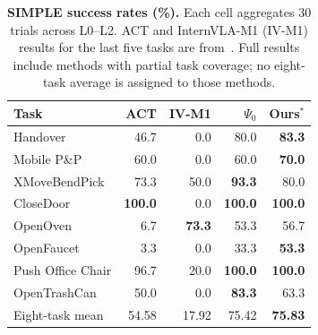 \begin{table}[t]
\centering\small
\caption{\textbf{SIMPLE success rates (\%).} Each cell aggregates 30 trials across L0--L2. ACT and InternVLA-M1 (IV-M1) results for the last five tasks are from~\cite{chen2026memorybeforegoal}. Full results include methods with partial task coverage; no eight-task average is assigned to those methods.}
\label{tab:simple_summary}
\setlength{\tabcolsep}{3.0pt}
\begin{tabular}{lrrrr}\toprule
Task & ACT & IV-M1 & $\Psi_0$ & Ours$^{*}$\\\midrule
Handover &46.7&0.0&80.0&\textbf{83.3}\\
Mobile P\&P &60.0&0.0&60.0&\textbf{70.0}\\
XMoveBendPick &73.3&50.0&\textbf{93.3}&80.0\\
CloseDoor &\textbf{100.0}&0.0&\textbf{100.0}&\textbf{100.0}\\
OpenOven &6.7&\textbf{73.3}&53.3&56.7\\
OpenFaucet &3.3&0.0&33.3&\textbf{53.3}\\
Push Office Chair &96.7&20.0&\textbf{100.0}&\textbf{100.0}\\
OpenTrashCan &50.0&0.0&\textbf{83.3}&63.3\\\midrule
Eight-task mean &54.58&17.92&75.42&\textbf{75.83}\\\bottomrule
\end{tabular}
\end{table}
